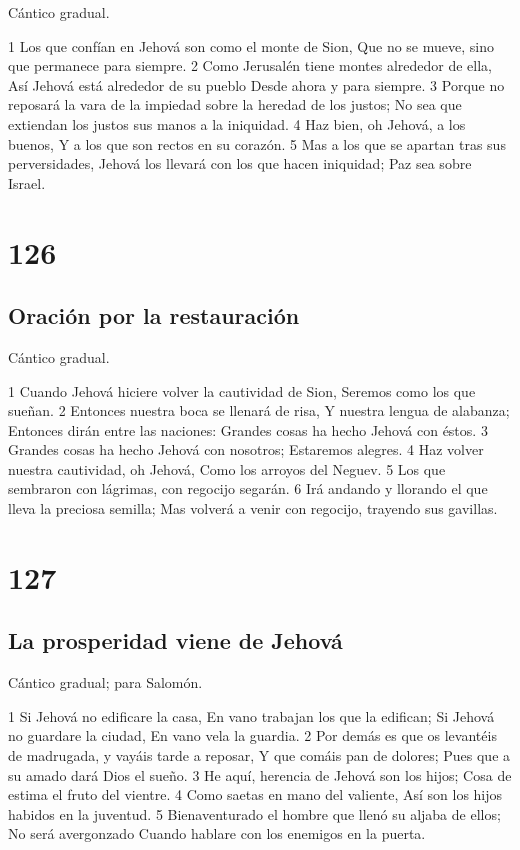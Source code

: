 Cántico gradual.

1 Los que confían en Jehová son como el monte de Sion,
Que no se mueve, sino que permanece para siempre.
2 Como Jerusalén tiene montes alrededor de ella,
Así Jehová está alrededor de su pueblo
Desde ahora y para siempre.
3 Porque no reposará la vara de la impiedad sobre la heredad de los justos;
No sea que extiendan los justos sus manos a la iniquidad.
4 Haz bien, oh Jehová, a los buenos,
Y a los que son rectos en su corazón.
5 Mas a los que se apartan tras sus perversidades,
Jehová los llevará con los que hacen iniquidad;
Paz sea sobre Israel.

\chapter{126}

\section*{Oración por la restauración}

Cántico gradual.

1 Cuando Jehová hiciere volver la cautividad de Sion,
Seremos como los que sueñan.
2 Entonces nuestra boca se llenará de risa,
Y nuestra lengua de alabanza;
Entonces dirán entre las naciones:
Grandes cosas ha hecho Jehová con éstos.
3 Grandes cosas ha hecho Jehová con nosotros;
Estaremos alegres.
4 Haz volver nuestra cautividad, oh Jehová,
Como los arroyos del Neguev.
5 Los que sembraron con lágrimas, con regocijo segarán.
6 Irá andando y llorando el que lleva la preciosa semilla;
Mas volverá a venir con regocijo, trayendo sus gavillas.

\chapter{127}

\section*{La prosperidad viene de Jehová}

Cántico gradual; para Salomón.

1 Si Jehová no edificare la casa,
En vano trabajan los que la edifican;
Si Jehová no guardare la ciudad,
En vano vela la guardia.
2 Por demás es que os levantéis de madrugada, y vayáis tarde a reposar,
Y que comáis pan de dolores;
Pues que a su amado dará Dios el sueño.
3 He aquí, herencia de Jehová son los hijos;
Cosa de estima el fruto del vientre.
4 Como saetas en mano del valiente,
Así son los hijos habidos en la juventud.
5 Bienaventurado el hombre que llenó su aljaba de ellos;
No será avergonzado
Cuando hablare con los enemigos en la puerta.

